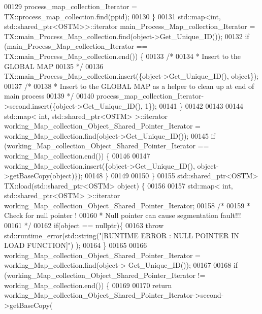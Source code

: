\begin{DoxyCode}
00129         process\_map\_collection\_Iterator = TX::process\_map\_collection.find(ppid);
00130     \}
00131     std::map<int, std::shared\_ptr<OSTM>>::iterator main\_Process\_Map\_collection\_Iterator = 
      TX::main\_Process\_Map\_collection.find(object->Get\_Unique\_ID());
00132     \textcolor{keywordflow}{if} (main\_Process\_Map\_collection\_Iterator == TX::main\_Process\_Map\_collection.end()) \{
00133         \textcolor{comment}{/*}
00134 \textcolor{comment}{         * Insert to the GLOBAL MAP }
00135 \textcolor{comment}{         */}
00136         TX::main\_Process\_Map\_collection.insert(\{\textcolor{keywordtype}{object}->Get\_Unique\_ID(), \textcolor{keywordtype}{object}\});
00137         \textcolor{comment}{/*}
00138 \textcolor{comment}{         * Insert to the GLOBAL MAP as a helper to clean up at end of main process }
00139 \textcolor{comment}{         */}
00140         process\_map\_collection\_Iterator->second.insert(\{\textcolor{keywordtype}{object}->Get\_Unique\_ID(), 1\});
00141     \} 
00142 
00143 
00144     std::map< int, std::shared\_ptr<OSTM> >::iterator working\_Map\_collection\_Object\_Shared\_Pointer\_Iterator 
      = working\_Map\_collection.find(object->Get\_Unique\_ID());
00145     \textcolor{keywordflow}{if} (working\_Map\_collection\_Object\_Shared\_Pointer\_Iterator == working\_Map\_collection.end()) \{
00146 
00147         working\_Map\_collection.insert(\{\textcolor{keywordtype}{object}->Get\_Unique\_ID(), \textcolor{keywordtype}{object}->getBaseCopy(\textcolor{keywordtype}{object})\});
00148     \}
00149 
00150 \}
00155 std::shared\_ptr<OSTM> TX::load(std::shared\_ptr<OSTM> \textcolor{keywordtype}{object}) \{
00156 
00157     std::map< int, std::shared\_ptr<OSTM> >::iterator working\_Map\_collection\_Object\_Shared\_Pointer\_Iterator;
00158     \textcolor{comment}{/*}
00159 \textcolor{comment}{     * Check for null pointer !}
00160 \textcolor{comment}{     * Null pointer can cause segmentation fault!!!}
00161 \textcolor{comment}{     */}
00162     \textcolor{keywordflow}{if}(\textcolor{keywordtype}{object} == \textcolor{keyword}{nullptr})\{
00163         \textcolor{keywordflow}{throw} std::runtime\_error(std::string(\textcolor{stringliteral}{"[RUNTIME ERROR : NULL POINTER IN LOAD FUNCTION]"}) );
00164     \}
00165 
00166         working\_Map\_collection\_Object\_Shared\_Pointer\_Iterator = working\_Map\_collection.find(object->
      Get\_Unique\_ID());
00167 
00168     \textcolor{keywordflow}{if} (working\_Map\_collection\_Object\_Shared\_Pointer\_Iterator != working\_Map\_collection.end()) \{
00169 
00170         \textcolor{keywordflow}{return} working\_Map\_collection\_Object\_Shared\_Pointer\_Iterator->second->getBaseCopy(

\end{DoxyCode}
